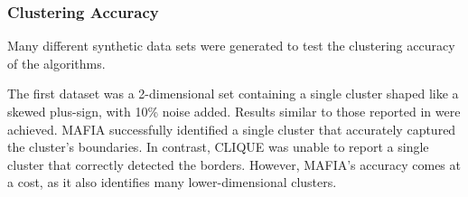 \subsubsection{Clustering Accuracy}
Many different synthetic data sets were generated to test the clustering accuracy of the algorithms.

The first dataset was a 2-dimensional set containing a single cluster shaped like a skewed plus-sign, with 10\% noise added. Results similar to those reported in \cite{mafia} were achieved. MAFIA successfully identified a single cluster that accurately captured the cluster’s boundaries. In contrast, CLIQUE was unable to report a single cluster that correctly detected the borders. However, MAFIA’s accuracy comes at a cost, as it also identifies many lower-dimensional clusters.



